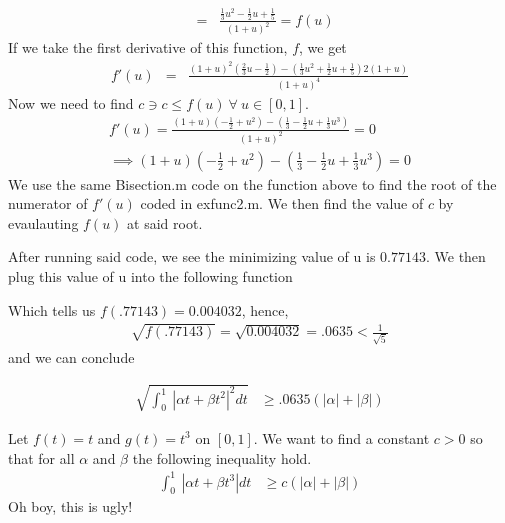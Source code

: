 \documentclass[11pt]{SelfArxOneColBMN}
\begin{document}
\begin{solution}
\begin{eqnarray*}
  \\
  &=& \frac{\frac{1}{3}u^2 - \frac{1}{2}u + \frac{1}{5}}{(1+u)^2} = f(u)
  \end{eqnarray*}
  If we take the first derivative of this function, $f$, we get
  \begin{eqnarray*}
    f'(u) &=& \frac{(1 + u)^2(\frac{2}{3}u - \frac{1}{2}) - (\frac{1}{3}u^2 +\frac{1}{2}u + \frac{1}{5})2(1 + u)}{(1 + u)^4}
  \end{eqnarray*}
  Now we need to find $c \ni c \leq f(u) \: \forall \: u \in [0,1]$. 
  \begin{eqnarray*}
    f'(u) = \frac{(1 + u)(-\frac{1}{2} + u^2) - (\frac{1}{3} - \frac{1}{2}u + \frac{1}{3}u^3)}{(1 + u)^2} = 0\\
    \implies (1 + u)(-\frac{1}{2} + u^2) - (\frac{1}{3} - \frac{1}{2}u + \frac{1}{3}u^3) = 0
  \end{eqnarray*}
  We use the same Bisection.m code on the function above to find the root of the numerator of $f'(u)$ coded in exfunc2.m. We then find the value of $c$ by evaulauting $f(u)$ at said root.

  \singlespacing
  
  \onehalfspacing

  After running said code, we see the minimizing value of u is $0.77143$. We then plug this value of u into the following function  
  \singlespacing
  
  \onehalfspacing

  Which tells us $f(.77143) = 0.004032$, hence,
  \begin{eqnarray*}
  \sqrt{f(.77143)} = \sqrt{0.004032} = .0635 < \frac{1}{\sqrt{5}}
  \end{eqnarray*}
  and we can conclude

  \begin{eqnarray*}
  \sqrt{\int_0^1 \: | \alpha t + \beta t^2|^2 dt} &\geq .0635( |\alpha| + |\beta|)
  \end{eqnarray*}
\end{solution}

\begin{exercise}
Let $f(t) = t$ and $g(t) = t^3$ on $[0,1]$.
We want to find a constant $c>0$ so that for all $\alpha$ and
$\beta$ the following inequality hold.
\begin{eqnarray*}
\int_0^1 \: | \alpha t + \beta t^3| dt &\geq c( |\alpha| + |\beta|)
\end{eqnarray*}
\noindent
Oh boy, this is ugly!
\end{exercise}
\end{document}
